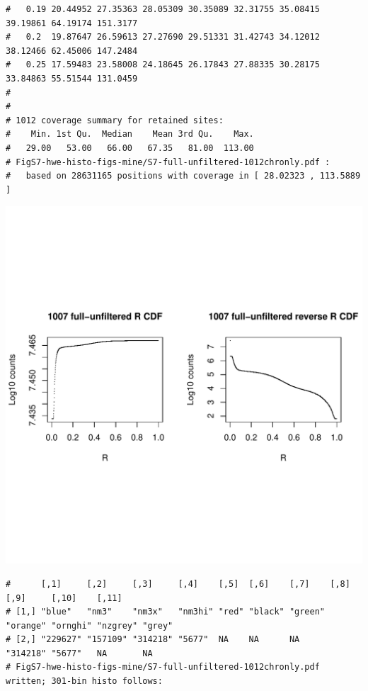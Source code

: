 \documentclass{article}\usepackage[]{graphicx}\usepackage[]{color}
\makeatletter
\def\maxwidth{ %
  \ifdim\Gin@nat@width>\linewidth
    \linewidth
  \else
    \Gin@nat@width
  \fi
}
\newenvironment{kframe}{%
 \def\at@end@of@kframe{}%
 \ifinner\ifhmode%
  \def\at@end@of@kframe{\end{minipage}}%
  \begin{minipage}{\columnwidth}%
 \fi\fi%
 \def\FrameCommand##1{\hskip\@totalleftmargin \hskip-\fboxsep
 \colorbox{shadecolor}{##1}\hskip-\fboxsep
     \hskip-\linewidth \hskip-\@totalleftmargin \hskip\columnwidth}%
 \MakeFramed {\advance\hsize-\width
   \@totalleftmargin\z@ \linewidth\hsize
   \@setminipage}}%
 {\par\unskip\endMakeFramed%
 \at@end@of@kframe}
\newenvironment{knitrout}{}{} %
\makeatother
\begin{document}
\begin{knitrout}
\begin{kframe}
\begin{verbatim}
#   0.19 20.44952 27.35363 28.05309 30.35089 32.31755 35.08415 39.19861 64.19174 151.3177
#   0.2  19.87647 26.59613 27.27690 29.51331 31.42743 34.12012 38.12466 62.45006 147.2484
#   0.25 17.59483 23.58008 24.18645 26.17843 27.88335 30.28175 33.84863 55.51544 131.0459
# 
# 
# 1012 coverage summary for retained sites:
#    Min. 1st Qu.  Median    Mean 3rd Qu.    Max. 
#   29.00   53.00   66.00   67.35   81.00  113.00 
# FigS7-hwe-histo-figs-mine/S7-full-unfiltered-1012chronly.pdf :
#   based on 28631165 positions with coverage in [ 28.02323 , 113.5889 ]
\end{verbatim}
\end{kframe}
\includegraphics[width=\maxwidth]{FigS7-hwe-histo-figs-knitr/unnamed-chunk-10-2} 
\begin{kframe}\begin{verbatim}
#      [,1]     [,2]     [,3]     [,4]    [,5]  [,6]    [,7]    [,8]     [,9]     [,10]    [,11] 
# [1,] "blue"   "nm3"    "nm3x"   "nm3hi" "red" "black" "green" "orange" "ornghi" "nzgrey" "grey"
# [2,] "229627" "157109" "314218" "5677"  NA    NA      NA      "314218" "5677"   NA       NA    
# FigS7-hwe-histo-figs-mine/S7-full-unfiltered-1012chronly.pdf written; 301-bin histo follows:
\end{verbatim}
\end{kframe}

\end{knitrout}
\end{document}
